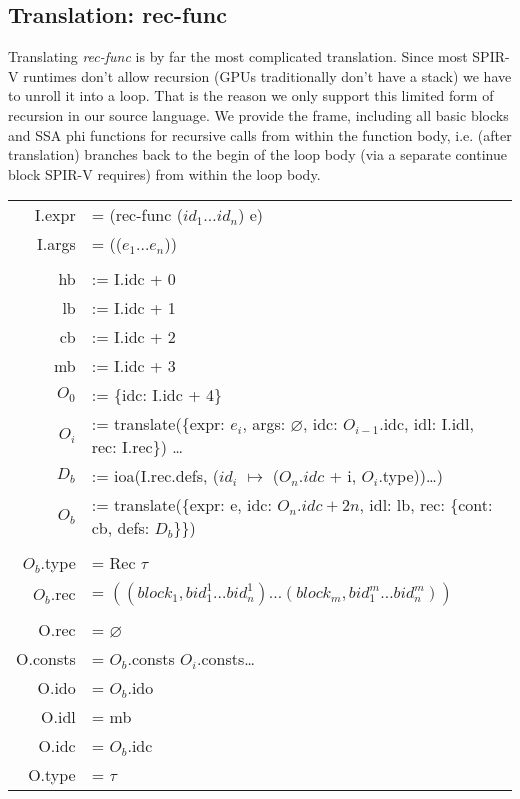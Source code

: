 \documentclass[letterpaper,12pt]{article}
\begin{document}
\newpage
\subsection{Translation: rec-func}

Translating \textit{rec-func} is by far the most complicated translation.
Since most SPIR-V runtimes don't allow recursion (GPUs traditionally
don't have a stack) we have to unroll it into a loop. That is the reason
we only support this limited form of recursion in our source language.
We provide the frame, including all basic blocks and SSA phi functions
for recursive calls from within the function body, i.e. (after translation)
branches back to the begin of the loop body (via a separate continue block SPIR-V requires)
from within the loop body.

\medskip
\begin{tabularx}{\linewidth}{rl}
	I.expr &= (rec-func\: ($id_1 \dots id_n$) e) \\
	I.args &= (($e_1 \dots e_n$)) \\
	\\
	hb &:= I.idc + 0 \\
	lb &:= I.idc + 1 \\
	cb &:= I.idc + 2 \\
	mb &:= I.idc + 3 \\
	$O_0$ &:= \{idc: I.idc + 4\} \\
	$O_i$ &:= translate(\{expr: $e_i$, args: $\varnothing$, idc: $O_{i - 1}$.idc, idl: I.idl, rec: I.rec\}) \dots \\
	$D_b$ &:= ioa(I.rec.defs, ($id_i$ $\mapsto$ ($O_n.idc$ + i, $O_i$.type))\dots) \\
	$O_b$ &:= translate(\{expr: e, idc: $O_n.idc + 2n$, idl: lb, rec: \{cont: cb, defs: $D_b$\}\}) \\
	\\
	$O_b$.type &= Rec $\tau$ \\
	$O_b$.rec &= $((block_1, bid_1^1 \dots bid_n^1) \dots (block_m, bid_1^m \dots bid_n^m))$ \\
	\\
	O.rec &= $\varnothing$ \\
	O.consts &= $O_b$.consts $O_i$.consts\dots \\
	O.ido &= $O_b$.ido \\
	O.idl &= mb \\
	O.idc &= $O_b$.idc \\
	O.type &= $\tau$
\end{tabularx}
\end{document}
